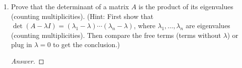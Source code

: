 \documentclass[../psets.tex]{subfiles}
\begin{document}
\begin{enumerate}[label={\textbf{1.\arabic*.}}]
\begin{proof}[Answer]
\begin{equation*}
        \end{equation*}
        as desired.
    \end{proof}
    \item Prove that the determinant of a matrix $A$ is the product of its eigenvalues (counting multiplicities). (Hint: First show that $\det(A-\lambda I)=(\lambda_1-\lambda)\cdots(\lambda_n-\lambda)$, where $\lambda_1,\dots,\lambda_n$ are eigenvalues (counting multiplicities). Then compare the free terms (terms without $\lambda$) or plug in $\lambda=0$ to get the conclusion.)
    \begin{proof}[Answer]



\end{proof}
\end{enumerate}
\end{document}
